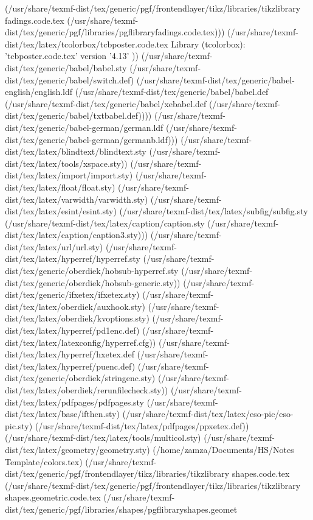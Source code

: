 (/usr/share/texmf-dist/tex/generic/pgf/frontendlayer/tikz/libraries/tikzlibrary
fadings.code.tex
(/usr/share/texmf-dist/tex/generic/pgf/libraries/pgflibraryfadings.code.tex)))
(/usr/share/texmf-dist/tex/latex/tcolorbox/tcbposter.code.tex
Library (tcolorbox): 'tcbposter.code.tex' version '4.13'
)) (/usr/share/texmf-dist/tex/generic/babel/babel.sty
(/usr/share/texmf-dist/tex/generic/babel/switch.def)
(/usr/share/texmf-dist/tex/generic/babel-english/english.ldf
(/usr/share/texmf-dist/tex/generic/babel/babel.def
(/usr/share/texmf-dist/tex/generic/babel/xebabel.def
(/usr/share/texmf-dist/tex/generic/babel/txtbabel.def))))
(/usr/share/texmf-dist/tex/generic/babel-german/german.ldf
(/usr/share/texmf-dist/tex/generic/babel-german/germanb.ldf)))
(/usr/share/texmf-dist/tex/latex/blindtext/blindtext.sty
(/usr/share/texmf-dist/tex/latex/tools/xspace.sty))
(/usr/share/texmf-dist/tex/latex/import/import.sty)
(/usr/share/texmf-dist/tex/latex/float/float.sty)
(/usr/share/texmf-dist/tex/latex/varwidth/varwidth.sty)
(/usr/share/texmf-dist/tex/latex/esint/esint.sty)
(/usr/share/texmf-dist/tex/latex/subfig/subfig.sty
(/usr/share/texmf-dist/tex/latex/caption/caption.sty
(/usr/share/texmf-dist/tex/latex/caption/caption3.sty)))
(/usr/share/texmf-dist/tex/latex/url/url.sty)
(/usr/share/texmf-dist/tex/latex/hyperref/hyperref.sty
(/usr/share/texmf-dist/tex/generic/oberdiek/hobsub-hyperref.sty
(/usr/share/texmf-dist/tex/generic/oberdiek/hobsub-generic.sty))
(/usr/share/texmf-dist/tex/generic/ifxetex/ifxetex.sty)
(/usr/share/texmf-dist/tex/latex/oberdiek/auxhook.sty)
(/usr/share/texmf-dist/tex/latex/oberdiek/kvoptions.sty)
(/usr/share/texmf-dist/tex/latex/hyperref/pd1enc.def)
(/usr/share/texmf-dist/tex/latex/latexconfig/hyperref.cfg))
(/usr/share/texmf-dist/tex/latex/hyperref/hxetex.def
(/usr/share/texmf-dist/tex/latex/hyperref/puenc.def)
(/usr/share/texmf-dist/tex/generic/oberdiek/stringenc.sty)
(/usr/share/texmf-dist/tex/latex/oberdiek/rerunfilecheck.sty))
(/usr/share/texmf-dist/tex/latex/pdfpages/pdfpages.sty
(/usr/share/texmf-dist/tex/latex/base/ifthen.sty)
(/usr/share/texmf-dist/tex/latex/eso-pic/eso-pic.sty)
(/usr/share/texmf-dist/tex/latex/pdfpages/ppxetex.def))
(/usr/share/texmf-dist/tex/latex/tools/multicol.sty)
(/usr/share/texmf-dist/tex/latex/geometry/geometry.sty)
(/home/zamza/Documents/HS/Notes Template/colors.tex)
(/usr/share/texmf-dist/tex/generic/pgf/frontendlayer/tikz/libraries/tikzlibrary
shapes.code.tex
(/usr/share/texmf-dist/tex/generic/pgf/frontendlayer/tikz/libraries/tikzlibrary
shapes.geometric.code.tex
(/usr/share/texmf-dist/tex/generic/pgf/libraries/shapes/pgflibraryshapes.geomet
